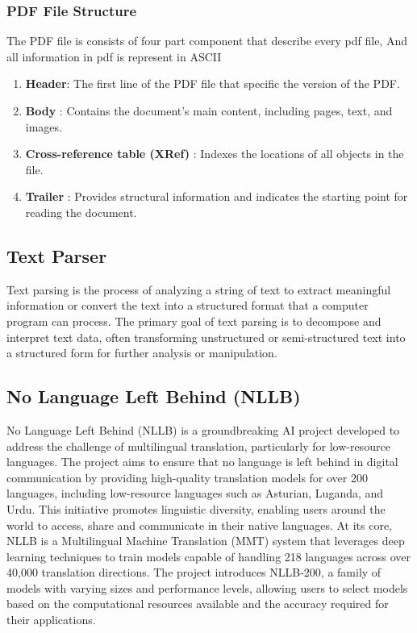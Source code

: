 \documentclass[12pt,oneside,openright,a4paper]{cpe-english-project}
\begin{document}
\subsubsection {PDF File Structure}

The PDF file is consists of four part component that describe every pdf file, And all information in pdf is represent in ASCII 

\begin{enumerate}
	\item \textbf{Header}: The first line of the PDF file that specific the version of the PDF.
	\item \textbf{Body} : Contains the document’s main content, including pages, text, and images.
	\item \textbf{Cross-reference table (XRef)} :  Indexes the locations of all objects in the file.
	\item \textbf{Trailer} : Provides structural information and indicates the starting point for reading the document.
\end{enumerate}


\subsection{Text Parser}

Text parsing is the process of analyzing a string of text to extract meaningful information or convert the text into a structured format that a computer program can process. The primary goal of text parsing is to decompose and interpret text data, often transforming unstructured or semi-structured text into a structured form for further analysis or manipulation.

\subsection {No Language Left Behind (NLLB)}

No Language Left Behind (NLLB) is a groundbreaking AI project developed to address the challenge of multilingual translation, particularly for low-resource languages. The project aims to ensure that no language is left behind in digital communication by providing high-quality translation models for over 200 languages, including low-resource languages such as Asturian, Luganda, and Urdu. This initiative promotes linguistic diversity, enabling users around the world to access, share and communicate in their native languages.
At its core, NLLB is a Multilingual Machine Translation (MMT) system that leverages deep learning techniques to train models capable of handling 218 languages across over 40,000 translation directions. The project introduces NLLB-200, a family of models with varying sizes and performance levels, allowing users to select models based on the computational resources available and the accuracy required for their applications.
\end{document}
